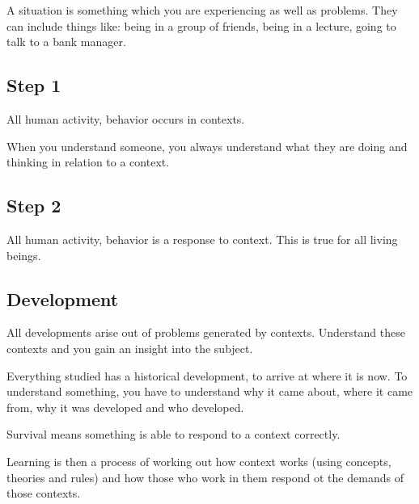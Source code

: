 A situation is something which you are experiencing as well as problems. They can include things like: being in a group of friends, being in a lecture, going to talk to a bank manager.
\subsection*{Step 1}
All human activity, behavior occurs in contexts. 

When you understand someone, you always understand what they are doing and thinking in relation to a context.


\subsection*{Step 2}
All human activity, behavior is a response to context. This is true for all living beings.

\subsection*{Development}
All developments arise out of problems generated by contexts. Understand these contexts and you gain an insight into the subject.

Everything studied has a historical development, to arrive at where it is now. To understand something, you have to understand why it came about, where it came from, why it was developed and who developed. 

Survival means something is able to respond to a context correctly.

Learning is then a process of working out how context works (using concepts, theories and rules) and how those who work in them respond ot the demands of those contexts.